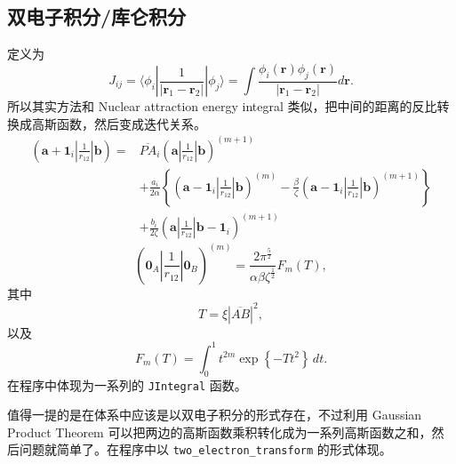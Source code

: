 \documentclass[12pt,a4paper,openany,twoside]{book}
\numberwithin{equation}{section}
\begin{document}
          \subsection{双电子积分/库仑积分}
            定义为
            \begin{equation}
                J_{ij} = \langle \phi_i | \frac{1}{|\boldsymbol{r}_1 - \boldsymbol{r}_2|} |\phi_j \rangle = \int \frac{\phi_i(\boldsymbol{r}) \phi_j(\boldsymbol{r})}{|\boldsymbol{r}_1 - \boldsymbol{r}_2|} d \boldsymbol{r}. 
            \end{equation}
            所以其实方法和 Nuclear attraction energy integral 类似，把中间的距离的反比转换成高斯函数，然后变成迭代关系。
            \begin{equation}
                \begin{aligned}
                ( \boldsymbol{a} + \boldsymbol{1}_i | \frac{1}{r_{12}} | \boldsymbol{b} ) =  & \overline{PA}_i ( \boldsymbol{a} | \frac{1}{r_{12}} | \boldsymbol{b} ) ^{(m+1)} \\
                & + \frac{a_i}{2\alpha} \left\{ ( \boldsymbol{a}-\boldsymbol{1}_i | \frac{1}{r_{12}} | \boldsymbol{b} ) ^{(m)} - \frac{\beta}{\zeta}( \boldsymbol{a} - \boldsymbol{1}_i | \frac{1}{r_{12}} | \boldsymbol{b} ) ^{(m+1)}\right\}\\
                & + \frac{b_i}{2\zeta} ( \boldsymbol{a} | \frac{1}{r_{12}} | \boldsymbol{b} - \boldsymbol{1}_i ) ^{(m+1)} 
                \end{aligned}
            \end{equation}
            \begin{equation}
                ( \boldsymbol{0}_A | \frac{1}{r_{12}} | \boldsymbol{0}_B ) ^{(m)} = \frac{2\pi ^{\frac{5}{2}}}{\alpha \beta \zeta^\frac{1}{2}} F_m(T)
            ,\end{equation}
            其中
            \begin{equation}
                T = \xi |\overline{AB}| ^2
            ,\end{equation}
            以及
            \begin{equation}
                F_m (T) = \int ^1_0 t^{2m} \exp \left\{ - T t^2 \right\}  \, dt 
            .\end{equation}
            在程序中体现为一系列的 \lstinline$JIntegral$ 函数。

            值得一提的是在体系中应该是以双电子积分的形式存在，不过利用 Gaussian Product Theorem 可以把两边的高斯函数乘积转化成为一系列高斯函数之和，然后问题就简单了。在程序中以 \lstinline$two_electron_transform$ 的形式体现。
\end{document}
